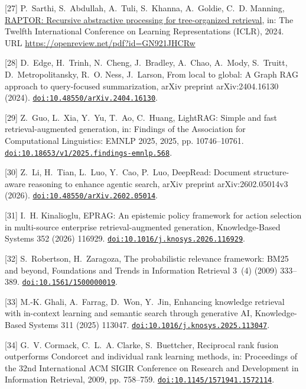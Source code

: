 [27] P.~Sarthi, S.~Abdullah, A.~Tuli, S.~Khanna, A.~Goldie, C.~D. Manning, \href{https://openreview.net/pdf?id=GN921JHCRw}{{RAPTOR}: Recursive abstractive processing for tree-organized retrieval}, in: The Twelfth International Conference on Learning Representations ({ICLR}), 2024. URL \url{https://openreview.net/pdf?id=GN921JHCRw}

[28] D.~Edge, H.~Trinh, N.~Cheng, J.~Bradley, A.~Chao, A.~Mody, S.~Truitt, D.~Metropolitansky, R.~O. Ness, J.~Larson, From local to global: A {Graph RAG} approach to query-focused summarization, arXiv preprint arXiv:2404.16130 (2024). \href {https://doi.org/10.48550/arXiv.2404.16130} {\texttt{doi:10.48550/arXiv.2404.16130}}.

[29] Z.~Guo, L.~Xia, Y.~Yu, T.~Ao, C.~Huang, {LightRAG}: Simple and fast retrieval-augmented generation, in: Findings of the Association for Computational Linguistics: EMNLP 2025, 2025, pp. 10746--10761. \href {https://doi.org/10.18653/v1/2025.findings-emnlp.568} {\texttt{doi:10.18653/v1/2025.findings-emnlp.568}}.

[30] Z.~Li, H.~Tian, L.~Luo, Y.~Cao, P.~Luo, {DeepRead}: Document structure-aware reasoning to enhance agentic search, arXiv preprint arXiv:2602.05014v3 (2026). \href {https://doi.org/10.48550/arXiv.2602.05014} {\texttt{doi:10.48550/arXiv.2602.05014}}.

[31] I.~H. Kinalioglu, {EPRAG}: An epistemic policy framework for action selection in multi-source enterprise retrieval-augmented generation, Knowledge-Based Systems 352 (2026) 116929. \href {https://doi.org/10.1016/j.knosys.2026.116929} {\texttt{doi:10.1016/j.knosys.2026.116929}}.

[32] S.~Robertson, H.~Zaragoza, The probabilistic relevance framework: {BM25} and beyond, Foundations and Trends in Information Retrieval 3~(4) (2009) 333--389. \href {https://doi.org/10.1561/1500000019} {\texttt{doi:10.1561/1500000019}}.

[33] M.-K. Ghali, A.~Farrag, D.~Won, Y.~Jin, Enhancing knowledge retrieval with in-context learning and semantic search through generative {AI}, Knowledge-Based Systems 311 (2025) 113047. \href {https://doi.org/10.1016/j.knosys.2025.113047} {\texttt{doi:10.1016/j.knosys.2025.113047}}.

[34] G.~V. Cormack, C.~L.~A. Clarke, S.~Buettcher, Reciprocal rank fusion outperforms {Condorcet} and individual rank learning methods, in: Proceedings of the 32nd International {ACM} {SIGIR} Conference on Research and Development in Information Retrieval, 2009, pp. 758--759. \href {https://doi.org/10.1145/1571941.1572114} {\texttt{doi:10.1145/1571941.1572114}}.

